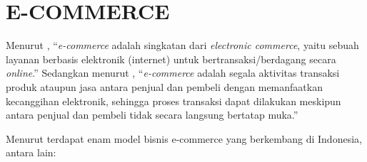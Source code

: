 \section{\uppercase{E-commerce}}
Menurut \citep{yuhefizar2013}, “\textit{e-commerce} adalah singkatan dari \textit{electronic commerce}, yaitu sebuah layanan berbasis elektronik (internet) untuk bertransaksi/berdagang secara \textit{online}.” Sedangkan menurut \citep{saputra2013}, “\textit{e-commerce} adalah segala aktivitas transaksi produk ataupun jasa antara penjual dan pembeli dengan memanfaatkan kecanggihan elektronik, sehingga proses transaksi dapat dilakukan meskipun antara penjual dan pembeli tidak secara langsung bertatap muka.”

Menurut \citep{pradana2015klasifikasi} terdapat enam model bisnis e-commerce yang berkembang di Indonesia, antara lain:

